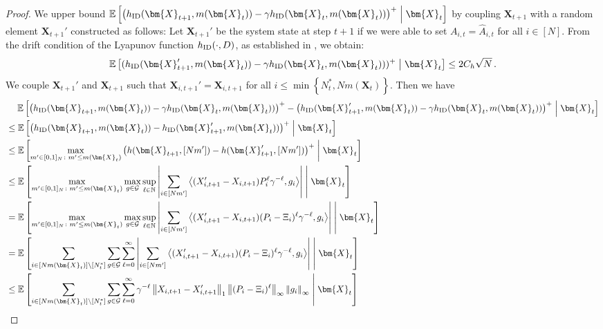 \documentclass{article}
\theoremstyle{plain}
\theoremstyle{remark}
\newcommand{\norm}[1]{\left\lVert#1\right\rVert}
\newcommand{\givenmiddle}{\;\middle|\;}
\newcommand{\abs}[1]{\left\lvert#1\right\rvert}
\newcommand{\sumell}{\sum_{\ell=0}^\infty}
\newcommand{\supell}{\sup_{\ell\in\mathbb{N}}}
\newcommand{\ID}{\textnormal{ID}}
\def\mX{{\bm{X}}}
\newcommand{\EE}{\mathbb{E}}
\newcommand{\innerproduct}[2]{\left\langle #1, #2 \right\rangle}
\newcommand{\bracket}[1]{\left(#1\right)}
\newcommand{\mbracket}[1]{\left[#1\right]}
\newcommand{\sets}[1]{\left\{ #1 \right\}}
\begin{document}
\begin{proof}
    We upper bound $\EE\mbracket{\bracket{h_{\ID}(\mX_{t+1},m(\mX_t))-\gamma h_{\ID}(\mX_t,m(\mX_t))}^+\givenmiddle\mX_t}$ by coupling $\mX_{t+1}$ with a random element $\mX_{t+1}'$ constructed as follows: Let $\mX_{t+1}'$ be the system state at step $t+1$ if we were able to set $A_{i,t}=\widehat{A}_{i,t}$ for all $i\in[N]$. From the drift condition of the Lyapunov function $h_{\ID}(\cdot,D)$, as established in , we obtain: 
    \begin{equation}
        \label{eq:pf-hid-x-mx-shrink:apply-drift-of-hid}
        \EE\mbracket{(h_{\ID}(\mX_{t+1}',m(\mX_t))-\gamma h_{\ID}(\mX_t,m(\mX_t)))^+\givenmiddle\mX_t} \leq 2C_h\sqrt{N}\,.
    \end{equation}
    We couple $\mX_{t+1}'$ and $\mX_{t+1}$ such that $\mX_{i,t+1}'=\mX_{i,t+1}$ for all $i\leq \min\sets{N_t^*,Nm(\mX_t)}$. Then we have
    \begin{align}
        \nonumber
        &\mspace{23mu} \EE\mbracket{\big(h_{\ID}(\mX_{t+1},m(\mX_t))-\gamma h_{\ID}(\mX_t,m(\mX_t))\big)^+-\big(h_{\ID}(\mX_{t+1}',m(\mX_t))-\gamma h_{\ID}(\mX_t,m(\mX_t))\big)^+\givenmiddle\mX_t}\\
        \nonumber
        &\leq \EE\mbracket{\big(h_{\ID}(\mX_{t+1},m(\mX_t))-h_{\ID}(\mX_{t+1}',m(\mX_t))\big)^+\givenmiddle\mX_t}\\
        \nonumber
        &\leq \EE\mbracket{\max_{m'\in[0,1]_N\colon m'\leq m(\mX_t)}\big(h(\mX_{t+1},[Nm'])-h(\mX_{t+1}',[Nm'])\big)^+\givenmiddle\mX_t}\\
        \nonumber
        &\leq \EE\mbracket{\max_{m'\in[0,1]_N\colon m'\leq m(\mX_t)} \max_{g\in \mathcal{G}}\supell \abs{\sum_{i\in[Nm']}\innerproduct{(X_{i,t+1}'-X_{i,t+1})P_i^{\ell} \gamma^{-\ell}}{g_i}}\givenmiddle\mX_t}\\
        \nonumber
        &= \EE\mbracket{\max_{m'\in[0,1]_N\colon m'\leq m(\mX_t)}\max_{g\in \mathcal{G}}\supell \abs{\sum_{i\in[Nm']}\innerproduct{(X_{i,t+1}'-X_{i,t+1})(P_i-\Xi_i)^{\ell} \gamma^{-\ell}}{g_i}}\givenmiddle\mX_t}\\
        \nonumber
        &= \EE\mbracket{\sum_{i\in[Nm(\mX_t)]\backslash[N_t^*]} \sum_{g\in \mathcal{G}}\sumell  \abs{\sum_{i\in[Nm']}\innerproduct{(X_{i,t+1}'-X_{i,t+1})(P_i-\Xi_i)^{\ell} \gamma^{-\ell}}{g_i}}\givenmiddle\mX_t}\\
        \nonumber
        &\leq \EE\mbracket{\sum_{i\in[Nm(\mX_t)]\backslash[N_t^*]} \sum_{g\in \mathcal{G}}\sumell \gamma^{-\ell} \norm{X_{i,t+1}-X_{i,t+1}'}_1\norm{(P_i-\Xi_i)^{\ell}}_\infty\norm{g_i}_\infty\givenmiddle\mX_t}\\

\end{align}
\end{proof}
\end{document}
